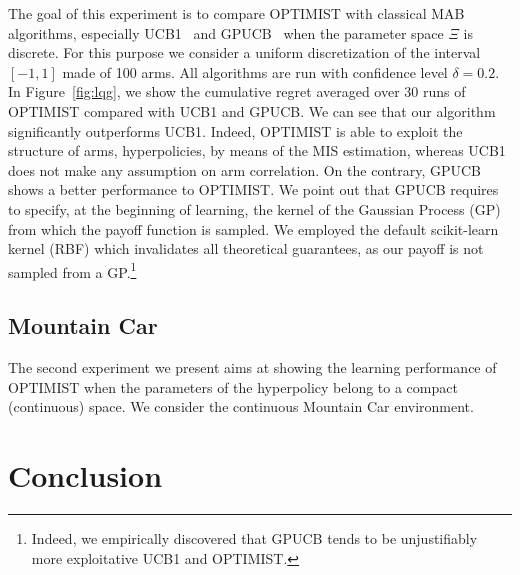 \documentclass{article}
\makeatletter
\DeclareRobustCommand{\algoname}{OPTIMIST\@\xspace}
\makeatother
\begin{document}
The goal of this experiment is to compare \algoname
with classical MAB algorithms, especially UCB1~\cite{auer2002finite} and GPUCB~\cite{srinivas2010gaussian} when the parameter space $\Xi$ is discrete. For this purpose we consider
a uniform discretization of the interval $[-1,1]$ made of 100 arms. All algorithms are run with confidence level $\delta=0.2$.
In Figure~\ref{fig:lqg}, we show the cumulative regret averaged over 30 runs of \algoname compared with UCB1 and GPUCB. We can see that our algorithm significantly outperforms UCB1. Indeed, \algoname is
able to exploit the structure of arms, \ie hyperpolicies, by means of the MIS estimation, whereas UCB1 does not make any assumption on arm correlation. On the contrary, GPUCB shows a better performance \wrt to \algoname. We point out that GPUCB requires to specify, at the beginning of learning, the kernel of the Gaussian Process (GP) from which the payoff function is sampled. We employed
the default scikit-learn kernel (RBF) which invalidates all theoretical guarantees, as our payoff is not sampled from a GP.\footnote{Indeed, we empirically discovered that GPUCB tends to
be unjustifiably more exploitative \wrt UCB1 and \algoname.}

\subsection{Mountain Car}
The second experiment we present aims at showing the learning performance of \algoname  
when the parameters of the hyperpolicy belong to a compact (continuous) space. We consider
the continuous Mountain Car environment.

\section{Conclusion}\label{sec:end}

%
%
\end{document}
